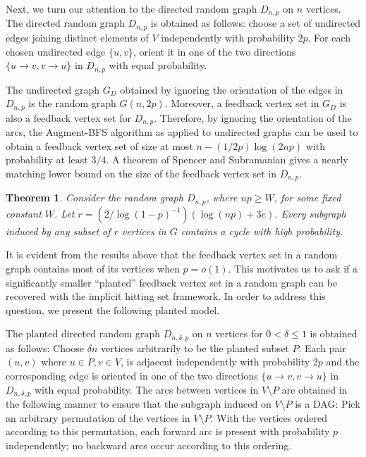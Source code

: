 \documentclass[11pt]{article}
\newtheorem{theorem}{Theorem}
\begin{document}
Next, we turn our attention to the directed random graph $D_{n,p}$ on $n$ vertices. The directed random graph $D_{n,p}$ is obtained as follows: choose a set of undirected edges joining distinct elements of $V$ independently with probability $2p$. For each chosen undirected edge $\{u,v\}$, orient it in one of the two directions $\{u\rightarrow v, v\rightarrow u\}$ in $D_{n,p}$ with equal probability.

The undirected graph $G_D$ obtained by ignoring the orientation of the edges in $D_{n,p}$ is the random graph $G(n,2p)$. Moreover, a feedback vertex set in $G_D$ is also a feedback vertex set for $D_{n,p}$. Therefore, by ignoring the orientation of the arcs, the Augment-BFS algorithm as applied to undirected graphs can be used to obtain a feedback vertex set of size at most $n-(1/2p)\log{(2np)}$ with probability at least $3/4$. A theorem of Spencer and Subramanian \cite{spencer-subramanian} gives a nearly matching lower bound on the size of the feedback vertex set in $D_{n,p}$.
\begin{theorem}\cite{spencer-subramanian}\label{theorem:directed-FVSlowerbound}
Consider the random graph $D_{n,p}$, where $np\geq W$, for some fixed constant $W$. Let $r=(2/\log{(1-p)^{-1}})(\log{(np)}+3e)$. Every subgraph induced by any subset of $r$ vertices in $G$ contains a cycle with high probability.
\end{theorem}

It is evident from the results above that the feedback vertex set in a random graph contains most of its vertices when $p=o(1)$. This motivates us to ask if a significantly smaller ``planted'' feedback vertex set in a random graph can be recovered with the implicit hitting set framework. In order to address this question, we present the following planted model.

The planted directed random graph ${D}_{n,\delta,p}$ on $n$ vertices for $0<\delta\leq 1$ is obtained as follows: Choose $\delta n$ vertices arbitrarily to be the planted subset $P$. Each pair $(u,v)$ where $u\in P, v\in V$, is adjacent independently with probability $2p$ and the corresponding edge is oriented in one of the two directions $\{u\rightarrow v, v\rightarrow u\}$ in $D_{n,\delta,p}$ with equal probability. The arcs between vertices in $V\setminus P$ are obtained in the following manner to ensure that the subgraph induced on $V\setminus P$ is a DAG: Pick an arbitrary permutation of the vertices in $V\setminus P$. With the vertices ordered according to this permutation, each forward arc is present with probability $p$ independently; no backward arcs occur according to this ordering.
\end{document}
